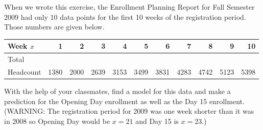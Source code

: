 \documentclass{ximera}
\begin{document}
\begin{problem}
    When we wrote this exercise, the Enrollment Planning Report for Fall Semester 2009 had only 10 data points for the first 10 weeks of the registration period.  Those numbers are given below.  

\begin{tabular}{|l|r|r|r|r|r|r|r|r|r|r|} \hline
Week $x$ & 1 & 2 & 3 & 4 & 5 & 6 & 7 & 8 & 9 & 10 \\ \hline 
Total  & & & & & & & & & & \\
Headcount & 1380 & 2000 & 2639 & 3153 & 3499 & 3831 & 4283 & 4742 & 5123 & 5398 \\ \hline
\end{tabular}

With the help of your classmates, find a model for this data and make a prediction for the Opening Day enrollment as well as the Day 15 enrollment.  (WARNING: The registration period for 2009 was one week shorter than it was in 2008 so Opening Day would be $x = 21$ and Day 15 is $x = 23$.)

\end{problem}
\end{document}
